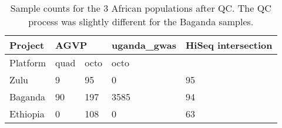 \begin{table}[htbp]
\centering
\begin{tabular}{lllll}
\hline
Project  & \multicolumn{2}{l}{AGVP} & uganda\_gwas & HiSeq intersection \\ \hline
Platform & quad        & octo       & octo         &                    \\ \hline
Zulu     & 9           & 95         & 0            & 95                 \\
Baganda  & 90          & 197        & 3585         & 94                 \\
Ethiopia & 0           & 108        & 0            & 63                
\end{tabular}
\caption{Sample counts for the 3 African populations after QC. The QC process was slightly different for the Baganda samples.}
\label{tab:chip_sample_summary}
\end{table}